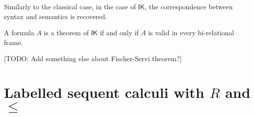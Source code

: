 \documentclass[twoside]{aiml18}
\newcommand{\todo}[1]{{\color{red}[TODO: #1]}}
\newcommand*{\IK}{\mathsf{IK}}
\newcommand*{\rel}{R}
\begin{document}
%

Similarly to the classical case, in the case of $\IK$, the correspondence between syntax and semantics is recovered.

\begin{theorem}\label{thm:plotkin}
	A formula $A$ is a theorem of $\IK$ if and only if $A$ is valid in every bi-relational frame.
\end{theorem}

\todo{Add something else about Fischer-Servi theorem?}

\section{Labelled sequent calculi with $\rel$ and $\le$}
\end{document}
